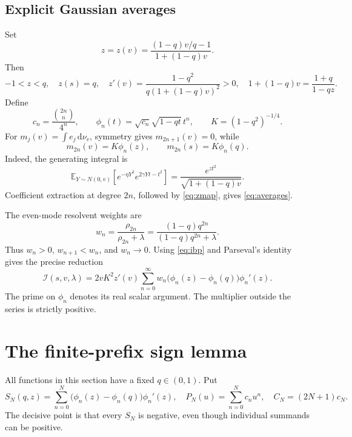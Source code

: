 \documentclass[11pt]{article}
\theoremstyle{remark}
\newcommand{\E}{\mathbb E}
\newcommand{\Ical}{\mathcal I}
\newcommand{\dd}{\,\mathrm d}
\begin{document}
\subsection{Explicit Gaussian averages}
Set
\begin{equation}\label{eq:z}
 z=z(v)=\frac{(1-q)v/q-1}{1+(1-q)v}.
\end{equation}
Then
\begin{equation}\label{eq:zmap}
 -1<z<q,\quad z(s)=q,\quad
 z'(v)=\frac{1-q^2}{q(1+(1-q)v)^2}>0,
 \quad 1+(1-q)v=\frac{1+q}{1-qz}.
\end{equation}
Define
\begin{equation}\label{eq:phi}
 c_n=\frac{\binom{2n}{n}}{4^n},\qquad
 \phi_n(t)=\sqrt{c_n}\sqrt{1-qt}\,t^n,\qquad
 K=(1-q^2)^{-1/4}.
\end{equation}
For $m_j(v)=\int e_j\dd\nu_v$, symmetry gives $m_{2n+1}(v)=0$, while
\begin{equation}\label{eq:averages}
 m_{2n}(v)=K\phi_n(z),\qquad m_{2n}(s)=K\phi_n(q).
\end{equation}
Indeed, the generating integral is
\[
 \E_{Y\sim N(0,v)}\!\left[e^{-\eta Y^2}e^{2\gamma Yt-t^2}\right]
 =\frac{e^{z t^2}}{\sqrt{1+(1-q)v}}.
\]
Coefficient extraction at degree $2n$, followed by \eqref{eq:zmap}, gives \eqref{eq:averages}.

The even-mode resolvent weights are
\begin{equation}\label{eq:weights}
 w_n=\frac{\rho_{2n}}{\rho_{2n}+\lambda}
 =\frac{(1-q)q^{2n}}{(1-q)q^{2n}+\lambda}.
\end{equation}
Thus $w_n>0$, $w_{n+1}<w_n$, and $w_n\to0$.
Using \eqref{eq:ibp} and Parseval's identity gives the precise reduction
\begin{equation}\label{eq:reduction}
 \boxed{\Ical(s,v,\lambda)=2vK^2z'(v)
 \sum_{n=0}^\infty w_n\bigl(\phi_n(z)-\phi_n(q)\bigr)\phi_n'(z).}
\end{equation}
The prime on $\phi_n$ denotes its real scalar argument.
The multiplier outside the series is strictly positive.

\section{The finite-prefix sign lemma}
All functions in this section have a fixed $q\in(0,1)$.
Put
\begin{equation}\label{eq:SN}
 S_N(q,z)=\sum_{n=0}^N\bigl(\phi_n(z)-\phi_n(q)\bigr)\phi_n'(z),
 \quad
 P_N(u)=\sum_{n=0}^N c_nu^n,\quad C_N=(2N+1)c_N.
\end{equation}
The decisive point is that every $S_N$ is negative, even though individual summands can be positive.
\end{document}
